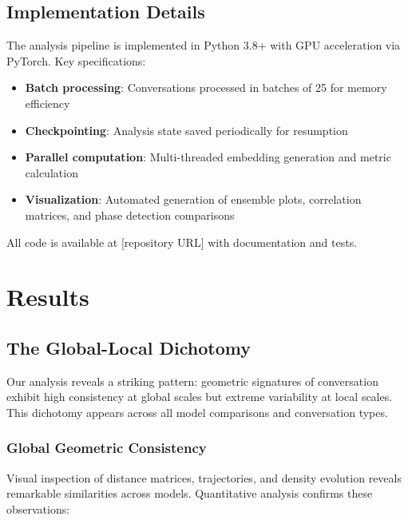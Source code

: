 \documentclass[11pt,letterpaper]{article}
\begin{document}
\subsection{Implementation Details}

The analysis pipeline is implemented in Python 3.8+ with GPU acceleration via PyTorch. Key specifications:
\begin{itemize}
\item \textbf{Batch processing}: Conversations processed in batches of 25 for memory efficiency
\item \textbf{Checkpointing}: Analysis state saved periodically for resumption
\item \textbf{Parallel computation}: Multi-threaded embedding generation and metric calculation
\item \textbf{Visualization}: Automated generation of ensemble plots, correlation matrices, and phase detection comparisons
\end{itemize}

All code is available at [repository URL] with documentation and tests.

\section{Results}

\subsection{The Global-Local Dichotomy}

Our analysis reveals a striking pattern: geometric signatures of conversation exhibit high consistency at global scales but extreme variability at local scales. This dichotomy appears across all model comparisons and conversation types.

\subsubsection{Global Geometric Consistency}

Visual inspection of distance matrices, trajectories, and density evolution reveals remarkable similarities across models. Quantitative analysis confirms these observations:
\end{document}
